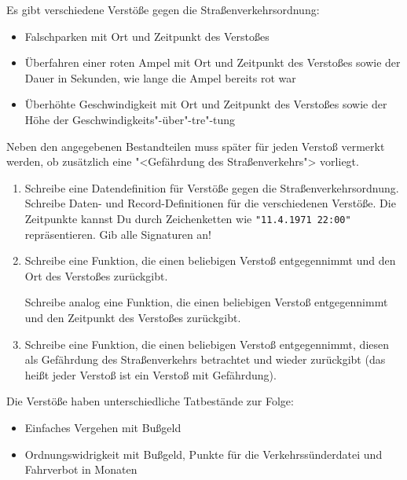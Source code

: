 \begin{aufgabe}

  Es gibt verschiedene Verstöße gegen die
  Straßenverkehrsordnung: 
  \begin{itemize}
  \item Falschparken mit Ort und Zeitpunkt des Verstoßes

  \item Überfahren einer roten Ampel mit Ort und Zeitpunkt des Verstoßes
    sowie der Dauer in Sekunden, wie lange die Ampel bereits rot war

  \item Überhöhte Geschwindigkeit mit Ort und Zeitpunkt des Verstoßes
    sowie der Höhe der Geschwindigkeits"-über"-tre"-tung
  \end{itemize}
  Neben den angegebenen Bestandteilen muss später für jeden Verstoß vermerkt 
  werden, ob zusätzlich eine "<Gefährdung des Straßenverkehrs"> vorliegt.
  
  \begin{enumerate}
  \item Schreibe eine Datendefinition für
    Verstöße gegen die Straßenverkehrsordnung.  Schreibe Daten-
    und Record-Definitionen für die verschiedenen Verstöße.  
    Die Zeitpunkte kannst Du durch Zeichenketten wie \verb|"11.4.1971 22:00"| repräsentieren.  
    Gib alle Signaturen an!

  \item Schreibe eine Funktion, die einen
    beliebigen Verstoß entgegennimmt und den Ort des Verstoßes
    zurückgibt.

    Schreibe analog eine Funktion, die einen
    beliebigen Verstoß entgegennimmt und den Zeitpunkt des Verstoßes
    zurückgibt.

  \item Schreibe eine Funktion, die einen
    beliebigen Verstoß entgegennimmt, diesen als Gefährdung des
    Straßenverkehrs betrachtet und wieder zurückgibt (das heißt jeder 
    Verstoß ist ein Verstoß mit Gefährdung).
  \end{enumerate}

  Die Verstöße haben unterschiedliche Tatbestände zur Folge:

  \begin{itemize}
  \item Einfaches Vergehen mit Bußgeld

  \item Ordnungswidrigkeit mit Bußgeld, Punkte für die
    Verkehrssünderdatei und Fahrverbot in Monaten


\end{itemize}
\end{aufgabe}
